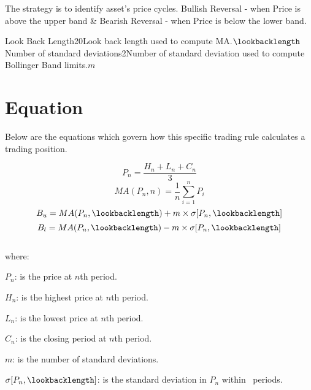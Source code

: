 \documentclass{article}
\begin{document}
\logo
{} %
\tblofcontents


\howtotrade
{The strategy is to identify asset's price cycles.
Bullish Reversal - when Price is above the upper band \&
Bearish Reversal - when Price is below the lower band.
}

{Look Back Length}{20}{Look back length used to compute MA.}{$\lookbacklength$}
{Number of standard deviations}{2}{Number of standard deviation used to compute Bollinger Band limits.}{$m$}
\stoptable %

\newpage
\section{Equation}
Below are the equations which govern how this specific trading rule calculates a trading position.

\begin{equation}
    P_{n} = \frac{H_{n} + L_{n} + C_{n}}{3}
\end{equation}
\begin{equation}
    MA(P_{n}, n) = \frac{1}{n} \sum_{i = 1}^{n} P_{i}
\end{equation}
\begin{equation}
    B_{u} = MA(P_{n}, \lookbacklength) + m \times \sigma[P_{n}, \lookbacklength]
\end{equation}
\begin{equation}
    B_{l} = MA(P_{n}, \lookbacklength) - m \times \sigma[P_{n}, \lookbacklength]
\end{equation}
\\ %
where:

$P_{n}$: is the price at $n$th period.

$H_{n}$: is the highest price at $n$th period.

$L_{n}$: is the lowest price at $n$th period.

$C_{n}$: is the closing period at $n$th period.

$m$: is the number of standard deviations.

$\sigma[P_{n}, \lookbacklength]$: is the standard deviation in $P_{n}$ within \lookbacklength \ periods.

\keyterms
\furtherlinks %
\end{document}

